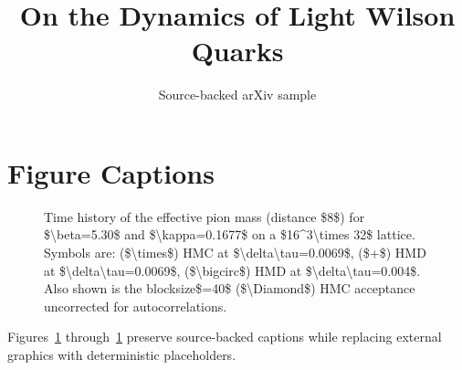 \documentclass[11pt]{article}
\title{On the Dynamics of Light Wilson Quarks}
\author{Source-backed arXiv sample}
\date{}
\begin{document}
\maketitle
\section{Figure Captions}

\begin{figure}[htbp]
\centering
\fbox{\rule{0pt}{1.15in}\rule{0.78\linewidth}{0pt}}
\caption{Time history of the effective pion mass (distance \$8\$) for \$\textbackslash{}beta=5.30\$ and \$\textbackslash{}kappa=0.1677\$ on a \$16\textasciicircum{}3\textbackslash{}times 32\$ lattice. Symbols are: (\$\textbackslash{}times\$) HMC at \$\textbackslash{}delta\textbackslash{}tau=0.0069\$, (\$+\$) HMD at \$\textbackslash{}delta\textbackslash{}tau=0.0069\$, (\$\textbackslash{}bigcirc\$) HMD at \$\textbackslash{}delta\textbackslash{}tau=0.004\$. Also shown is the blocksize\$=40\$ (\$\textbackslash{}Diamond\$) HMC acceptance uncorrected for autocorrelations.}
\label{fig:source-1}
\end{figure}


Figures~\ref{fig:source-1} through~\ref{fig:source-1} preserve source-backed captions while replacing external graphics with deterministic placeholders.
\end{document}
